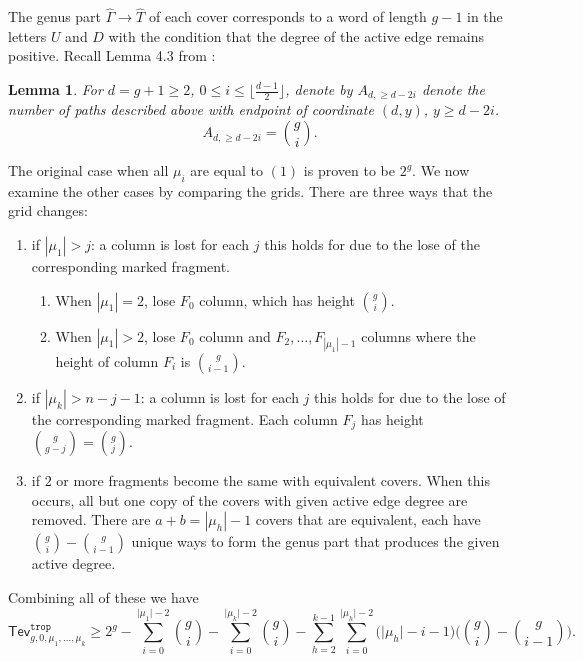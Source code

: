 \documentclass[11pt,reqno]{amsart}
\newtheorem{lemma}[theorem]{Lemma}
\theoremstyle{definition}
\newcommand\trop{{\mathtt{trop}}}
\newcommand{\gGamma}{\widehat{\Gamma}}
\newcommand{\gT}{\widehat{T}}
\newcommand{\Tev}{{\mathsf{Tev}}}
\begin{document}
The genus part $\gGamma\to \gT$ of each cover corresponds to a word of length $g-1$ in the letters $U$ and $D$ with the condition that the degree of the active edge remains positive. Recall Lemma 4.3 from \cite{troptev}:
\begin{lemma} \label{lemma:deg active}
For $d = g+1 \geq 2$, $0\leq i\leq \lfloor\frac{d-1}{2}\rfloor$, denote by $A_{d, \geq d-2i}$ denote the number of paths described above with endpoint of coordinate $(d, y)$, $y\geq d-2i$. 
\begin{equation}
  A_{d,\geq d-2i}%
  = {{g}\choose{i}}.
\end{equation}
\end{lemma}
The original case when all $\mu_i$ are equal to $(1)$ is proven to be $2^g$. We now examine the other cases by comparing the grids. There are three ways that the grid changes:
\begin{enumerate}
    \item if $|\mu_1|>j$: a column is lost for each $j$ this holds for due to the lose of the corresponding marked fragment. 
    \begin{enumerate}
        \item When $|\mu_1|=2$, lose $F_0$ column, which has height ${{g}\choose{i}}$.
        \item When $|\mu_1|>2$, lose $F_0$ column and $F_2,\dots,F_{|\mu_1|-1}$ columns where the height of column $F_i$ is ${{g}\choose{i-1}}$.
    \end{enumerate}
    \item if $|\mu_k|>n-j-1$: a column is lost for each $j$ this holds for due to the lose of the corresponding marked fragment. Each column $F_j$ has height ${{g}\choose{g-j}}={{g}\choose{j}}$.
    \item if $2$ or more fragments become the same with equivalent covers. When this occurs, all but one copy of the covers with given active edge degree are removed. There are $a+b=|\mu_h|-1$ covers that are equivalent, each have ${{g}\choose{i}}-{{g}\choose{i-1}}$ unique ways to form the genus part that produces the given active degree.
\end{enumerate}
Combining all of these we have 
 \begin{equation}
    \Tev^\trop_{g,0,\mu_1,\dots,\mu_k}\geq2^g -\sum_{i=0}^{\lvert\mu_1\rvert-2}{g\choose i}-\sum_{i=0}^{\lvert\mu_k\rvert-2}{g\choose i}-\sum_{h=2}^{k-1}\sum_{i=0}^{\lvert\mu_h\rvert-2}\bigg(\lvert\mu_h\rvert-i-1\bigg)\bigg({g\choose i}-{g \choose i-1}\bigg).
    \end{equation}
 
\end{document}
